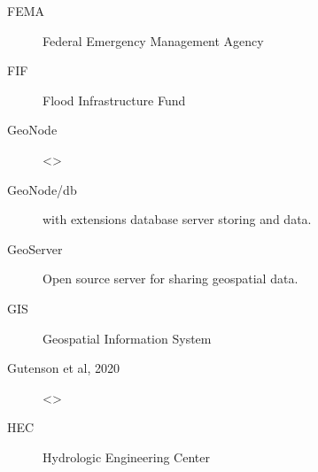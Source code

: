 \documentclass[letterpaper,10pt,english]{sphinxmanual}
\begin{document}
\begin{description}
\item[{FEMA\label{\detokenize{glossary:term-FEMA}}}] \leavevmode
\sphinxAtStartPar
Federal Emergency Management Agency

\item[{FIF\label{\detokenize{glossary:term-FIF}}}] \leavevmode
\sphinxAtStartPar
Flood Infrastructure Fund

\item[{GeoNode\label{\detokenize{glossary:term-GeoNode}}}] \leavevmode
\sphinxAtStartPar
\textless{}\textgreater{}

\item[{GeoNode/db\label{\detokenize{glossary:term-GeoNode-db}}}] \leavevmode
\sphinxAtStartPar
{\hyperref[\detokenize{glossary:term-PostgreSQL}]{}} with {\hyperref[\detokenize{glossary:term-PostGIS}]{}} extensions database server storing {\hyperref[\detokenize{glossary:term-GeoNode}]{}} {\hyperref[\detokenize{glossary:term-Django}]{}} and {\hyperref[\detokenize{glossary:term-GeoServer}]{}} data.

\item[{GeoServer\label{\detokenize{glossary:term-GeoServer}}}] \leavevmode
\sphinxAtStartPar
Open source server for sharing geospatial data.

\item[{GIS\label{\detokenize{glossary:term-GIS}}}] \leavevmode
\sphinxAtStartPar
Geospatial Information System

\item[{Gutenson et al, 2020\label{\detokenize{glossary:term-Gutenson-et-al-2020}}}] \leavevmode
\sphinxAtStartPar
\textless{}\textgreater{}

\item[{HEC\label{\detokenize{glossary:term-HEC}}}] \leavevmode
\sphinxAtStartPar
Hydrologic Engineering Center


\end{description}
\end{document}
